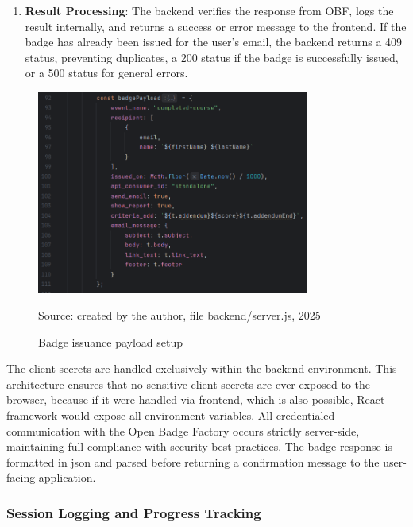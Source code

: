 \begin{enumerate}
This was discovered through extensive and thorough debugging. 
Its inclusion can be seen within the badge issuance payload in Figure \ref{fig:payload} and caused multiple setbacks during backend development.
The payload is then submitted as a POST request to \textit{/event/client\_id/badge\_id/issue}.
\item \textbf{Result Processing}: The backend verifies the response from OBF, logs the result internally, and returns a success or error message to the frontend. 
If the badge has already been issued for the user’s email, the backend returns a 409 status, preventing duplicates, a 200 status if the badge is successfully issued, or a 500 status for general errors.
\end{enumerate}
\begin{figure}[hbtp]
\centering
\includegraphics[width=0.8\textwidth]{Media/payload.png}
\caption{Badge issuance payload setup}
\label{fig:payload}
{\raggedright \small{Source: created by the author, file backend/server.js}, 2025\par}
\end{figure}
The client secrets are handled exclusively within the backend environment. 
This architecture ensures that no sensitive client secrets are ever exposed to the browser, because if it were handled via frontend, which is also possible, React framework would expose all environment variables. 
All credentialed communication with the Open Badge Factory occurs strictly server-side, maintaining full compliance with security best practices. 
The badge response is formatted in \acrshort{json} and parsed before returning a confirmation message to the user-facing application.

\subsubsection{Session Logging and Progress Tracking}

